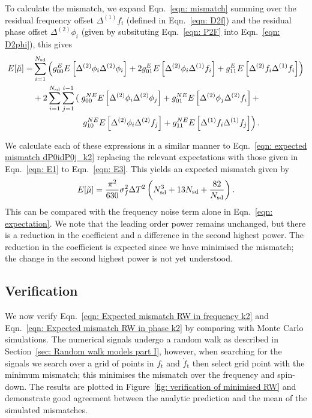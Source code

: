 To calculate the mismatch, we expand Eqn.~\eqref{eqn: mismatch} summing over
the residual frequency offset $\Delta^{(1)}f_i$ (defined in Eqn.~\eqref{eqn:
D2f}) and the residual phase offset $\Delta^{(2)}\phi_i$ (given by
subsituting Eqn.~\eqref{eqn: P2F} into Eqn.~\eqref{eqn: D2phi}), this gives
\begin{align}
\begin{split}
E[\mutilde] = &
\s{i=1}{\Nsd}\left(g_{00}^{E}E\left[\Delta^{(2)}\phi_{i}\Delta^{(2)}\phi_{i}\right]
+ 2 g_{01}^{E}E\left[\Delta^{(2)}\phi_{i}\Delta^{(1)}\f_{i}\right]
+  g_{11}^{E} E\left[\Delta^{(2)}\f_{i}\Delta^{(1)}\f_{i}\right] \right) \\
& + 2\s{i=1}{\Nsd}\s{j=1}{i-1}\left(\right.
g_{00}^{NE}E\left[\Delta^{(2)}\phi_{i}\Delta^{(2)}\phi_{j}\right] +
g_{01}^{NE}E\left[\Delta^{(2)}\phi_{j}\Delta^{(2)}\f_{i}\right] +  \\
&\hspace{20mm}\left. g_{10}^{NE}E\left[\Delta^{(2)}\phi_{i}\Delta^{(2)}\f_{j}\right] +
g_{11}^{NE} E\left[\Delta^{(1)}\f_{i}\Delta^{(1)}\f_{j}\right] \right).
\end{split}
\end{align}


We calculate each of these expressions in a similar manner to Eqn.~\eqref{eqn:
expected mismatch dP0idP0j_k2} replacing the relevant expectations with those
given in Eqn.~\eqref{eqn: E1} to Eqn.~\eqref{eqn: E3}. This yields an expected
mismatch given by
\begin{equation}
E[\tilde{\mu}] = \frac{\pi^{2} }{630} \sigma_{f}^{2} \Delta T^{2}  \left(N_{\textrm{sd}}^{3} + 13N_{\textrm{sd}} + \frac{82}{N_{\textrm{sd}}} \right).
\label{eqn: Expected mismatch RW in frequency k2}
\end{equation}
This can be compared with the frequency noise term alone in Eqn.~\eqref{eqn:
expectation}. We note that the leading order power remains unchanged, but there
is a reduction in the coefficient and a difference in the second highest
power. The reduction in the coefficient is expected since we have minimised
the mismatch; the change in the second highest power is not yet understood.

\subsection{Verification}

We now verify Eqn.~\eqref{eqn: Expected mismatch RW in frequency k2} and
Eqn.~\eqref{eqn: Expected mismatch RW in phase k2} by comparing with Monte
Carlo simulations. The numerical signals undergo a random walk as described in
Section~\ref{sec: Random walk models part I}, however, when searching for the
signals we search over a grid of points in $f_\textrm{t}$ and
$\dot{f}_\textrm{t}$ then select grid point with the minimum mismatch; this
minimises the mismatch over the frequency and spin-down. The results are
plotted in Figure~\ref{fig: verification of minimised RW} and demonstrate good
agreement between the analytic prediction and the mean of the simulated
mismatches.

